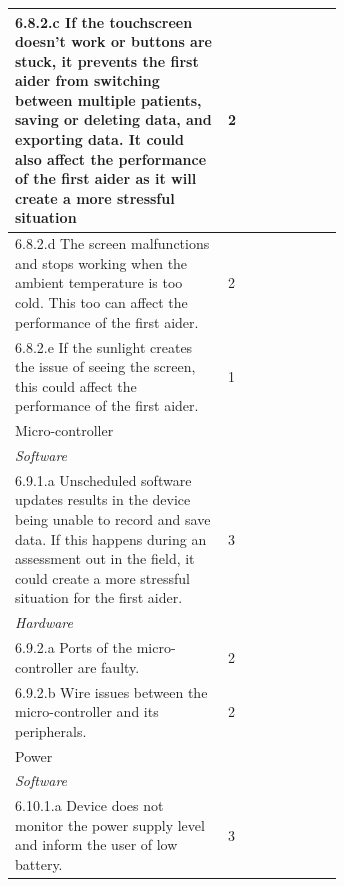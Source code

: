 \documentclass{article}
\begin{document}
\begin{longtable}{|p{0.65\linewidth}|l|}
\hline
6.8.2.c If the touchscreen doesn’t work or buttons are stuck, it prevents the first aider from switching between multiple patients, saving or deleting data, and exporting data. It could also affect the performance of the first aider as it will create a more stressful situation                                                                             & 2                   \\
\hline
6.8.2.d The screen malfunctions and stops working when the ambient temperature is too cold. This
too can affect the performance of the first aider.
                                                                & 2                   \\
\hline
6.8.2.e If the sunlight creates the issue of seeing the screen, this could affect the performance of the first aider.                                              & 1                   \\
\hline  
\rowcolor{Gray}
Micro-controller                                                   &                     \\
\hline
\textit{Software}                                                  &                     \\
6.9.1.a Unscheduled software updates results in the device being unable to record and save data. If this happens during an assessment out in the field, it could create a more stressful situation for the first aider.                                             & 3                   \\
\hline
\textit{Hardware}                                                  &                     \\
\hline
6.9.2.a Ports of the micro-controller are faulty.
                                                                 & 2                  \\
\hline
6.9.2.b Wire issues between the micro-controller and its peripherals.                                                                                             & 2                   \\
\hline   
\rowcolor{Gray}
Power                                                              &                     \\
\hline
\textit{Software}                                                  &                     \\
\hline
6.10.1.a Device does not monitor the power supply level and inform the user of low battery.                                                                        & 3                   \\

\end{longtable}
\end{document}
